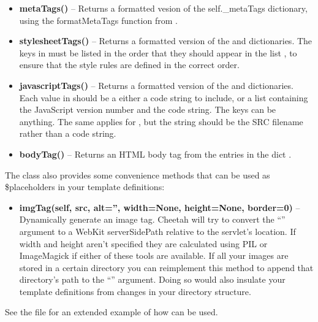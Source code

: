 \begin{itemize}
\item {\bf metaTags()} -- Returns a formatted vesion of the self.\_metaTags
     dictionary, using the formatMetaTags function from
     .
\item {\bf stylesheetTags()} -- Returns a formatted version of the
      and  dictionaries.
     The keys in  must be listed in the order that
     they should appear in the list , to ensure
     that the style rules are defined in the correct order.
\item {\bf javascriptTags()} -- Returns a formatted version of the
      and  dictionaries.
     Each value in  should be a either a code string
     to include, or a list containing the JavaScript version number and the code
     string. The keys can be anything.  The same applies for
     , but the string should be the SRC filename
     rather than a code string.
\item {\bf bodyTag()} -- Returns an HTML body tag from the entries in the dict
     .
\end{itemize}

The class also provides some convenience methods that can be used as
\$placeholders in your template definitions:

\begin{itemize}
\item {\bf imgTag(self, src, alt='', width=None, height=None, border=0)} --
     Dynamically generate an image tag.  Cheetah will try to convert the
     ``'' argument to a WebKit serverSidePath relative to the
     servlet's location. If width and height aren't specified they are
     calculated using PIL or ImageMagick if either of these tools are available.
     If all your images are stored in a certain directory you can reimplement
     this method to append that directory's path to the ``'' argument.
     Doing so would also insulate your template definitions from changes in your
     directory structure.
\end{itemize}

See the file 
for an extended example of how  can be used.



